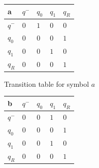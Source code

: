 \documentclass{mini}
\begin{document}
%
%
\begin{figure}[H]
    \begin{center}
        
        \setlength{\tabcolsep}{4pt}
        \renewcommand{\arraystretch}{1.4}
        
        \begin{subfigure}{.5\textwidth}
            
            \centering
            \begin{tabular}{|P{1.0cm} || P{0.8cm} | P{0.8cm} | P{0.8cm} | P{0.8cm}|}
                
                \hline
                a & $q^-$ & $q_0$ & $q_1$ & $q_R$ \\
                \hline
                \hline
                $q^-$ 		& $0$ & $1$ & $0$ & $0$ \\
                \hline
                $q_0$ 		& $0$ & $0$ & $0$ & $1$ \\
                \hline
                $q_1$ 		& $0$ & $0$ & $1$ & $0$ \\
                \hline
                $q_R$  					& $0$ & $0$ & $0$ & $1$ \\
                \hline
                
            \end{tabular}
            
            \caption{Transition table for symbol $a$}
            \label{fig:ttable_bin_a}	
            
        \end{subfigure}%
        \begin{subfigure}{.5\textwidth}
            
            \centering
            \begin{tabular}{|P{1.0cm} || P{0.8cm} | P{0.8cm} | P{0.8cm} | P{0.8cm}|}
                
                \hline
                b & $q^-$ & $q_0$ & $q_1$ & $q_R$ \\
                \hline
                \hline
                $q^-$ 		& $0$ & $0$ & $1$ & $0$ \\
                \hline
                $q_0$ 		& $0$ & $0$ & $0$ & $1$ \\
                \hline
                $q_1$ 		& $0$ & $0$ & $1$ & $0$ \\
                \hline
                $q_R$  					& $0$ & $0$ & $0$ & $1$ \\
                \hline
                

\end{tabular}
\end{subfigure}
\end{center}
\end{figure}
\end{document}
